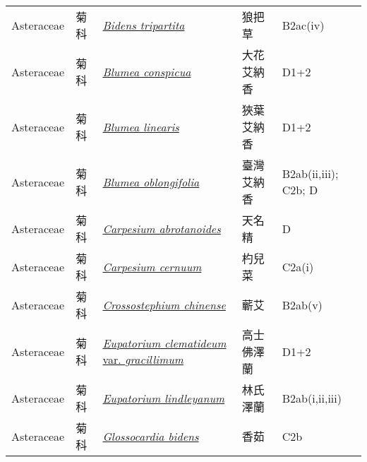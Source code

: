 {\begin{longtable}{p{2.5cm}p{2cm}p{5cm}p{2.5cm}p{3cm}}
    Asteraceae & 菊科 & \href{http://www.theplantlist.org/tpl1.1/search?q=Bidens+tripartita}{\textit{Bidens tripartita} } & 狼把草 & B2ac(iv) \index{Bidens@\textit{Bidens}!tripartita@\textit{tripartita}}  \index{狼把草} \\
    Asteraceae & 菊科 & \href{http://www.theplantlist.org/tpl1.1/search?q=Blumea+conspicua}{\textit{Blumea conspicua} } & 大花艾納香 & D1+2 \index{Blumea@\textit{Blumea}!conspicua@\textit{conspicua}}  \index{大花艾納香} \\
    Asteraceae & 菊科 & \href{http://www.theplantlist.org/tpl1.1/search?q=Blumea+linearis}{\textit{Blumea linearis} } & 狹葉艾納香 & D1+2 \index{Blumea@\textit{Blumea}!linearis@\textit{linearis}}  \index{狹葉艾納香} \\
    Asteraceae & 菊科 & \href{http://www.theplantlist.org/tpl1.1/search?q=Blumea+oblongifolia}{\textit{Blumea oblongifolia} } & 臺灣艾納香 & B2ab(ii,iii); C2b; D \index{Blumea@\textit{Blumea}!oblongifolia@\textit{oblongifolia}}  \index{臺灣艾納香} \\
    Asteraceae & 菊科 & \href{http://www.theplantlist.org/tpl1.1/search?q=Carpesium+abrotanoides}{\textit{Carpesium abrotanoides} } & 天名精 & D \index{Carpesium@\textit{Carpesium}!abrotanoides@\textit{abrotanoides}}  \index{天名精} \\
    Asteraceae & 菊科 & \href{http://www.theplantlist.org/tpl1.1/search?q=Carpesium+cernuum}{\textit{Carpesium cernuum} } & 杓兒菜 & C2a(i) \index{Carpesium@\textit{Carpesium}!cernuum@\textit{cernuum}}  \index{杓兒菜} \\
    Asteraceae & 菊科 & \href{http://www.theplantlist.org/tpl1.1/search?q=Crossostephium+chinense}{\textit{Crossostephium chinense} } & 蘄艾 & B2ab(v) \index{Crossostephium@\textit{Crossostephium}!chinense@\textit{chinense}}  \index{蘄艾} \\
    Asteraceae & 菊科 & \href{http://www.theplantlist.org/tpl1.1/search?q=Eupatorium+clematideum+var.+gracillimum}{\textit{Eupatorium clematideum} var. \textit{gracillimum} } & 高士佛澤蘭 & D1+2 \index{Eupatorium@\textit{Eupatorium}!clematideum@\textit{clematideum}!var. gracillimum@var. \textit{gracillimum}}  \index{高士佛澤蘭} \\
    Asteraceae & 菊科 & \href{http://www.theplantlist.org/tpl1.1/search?q=Eupatorium+lindleyanum}{\textit{Eupatorium lindleyanum} } & 林氏澤蘭 & B2ab(i,ii,iii) \index{Eupatorium@\textit{Eupatorium}!lindleyanum@\textit{lindleyanum}}  \index{林氏澤蘭} \\
    Asteraceae & 菊科 & \href{http://www.theplantlist.org/tpl1.1/search?q=Glossocardia+bidens}{\textit{Glossocardia bidens} } & 香茹 & C2b \index{Glossocardia@\textit{Glossocardia}!bidens@\textit{bidens}}  \index{香茹} \\

\end{longtable}}
